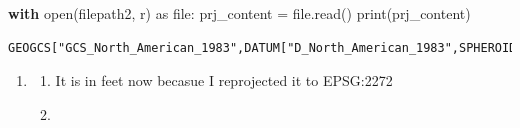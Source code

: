 \documentclass[
  letterpaper,
  DIV=11,
  numbers=noendperiod]{scrartcl}
\newenvironment{Shaded}{\begin{snugshade}}{\end{snugshade}}
\newcommand{\BuiltInTok}[1]{\textcolor[rgb]{0.00,0.23,0.31}{#1}}
\newcommand{\ControlFlowTok}[1]{\textcolor[rgb]{0.00,0.23,0.31}{\textbf{#1}}}
\newcommand{\ImportTok}[1]{\textcolor[rgb]{0.00,0.46,0.62}{#1}}
\newcommand{\NormalTok}[1]{\textcolor[rgb]{0.00,0.23,0.31}{#1}}
\newcommand{\OperatorTok}[1]{\textcolor[rgb]{0.37,0.37,0.37}{#1}}
\newcommand{\StringTok}[1]{\textcolor[rgb]{0.13,0.47,0.30}{#1}}
\begin{document}
\begin{Shaded}
\begin{Highlighting}[]
\ControlFlowTok{with} \BuiltInTok{open}\NormalTok{(filepath2, }\StringTok{\textquotesingle{}r\textquotesingle{}}\NormalTok{) }\ImportTok{as} \BuiltInTok{file}\NormalTok{:}
\NormalTok{    prj\_content }\OperatorTok{=} \BuiltInTok{file}\NormalTok{.read()}
\BuiltInTok{print}\NormalTok{(prj\_content)}
\end{Highlighting}
\end{Shaded}

\begin{verbatim}
GEOGCS["GCS_North_American_1983",DATUM["D_North_American_1983",SPHEROID["GRS_1980",6378137,298.257222101]],PRIMEM["Greenwich",0],UNIT["Degree",0.017453292519943295]]
\end{verbatim}

\begin{enumerate}
\def\labelenumi{\arabic{enumi}.}
\setcounter{enumi}{4}
\item
  \begin{enumerate}
  \def\labelenumii{\alph{enumii}.}
  \item
    It is in feet now becasue I reprojected it to EPSG:2272
  \item
  \end{enumerate}
\end{enumerate}
\end{document}
